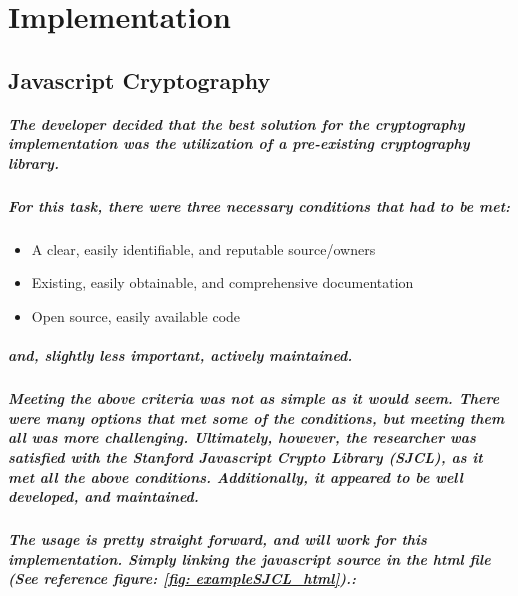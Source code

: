 \chapter{Implementation}



\section{Javascript Cryptography}

\paragraph{The developer decided that the best solution for the cryptography implementation was the utilization of a pre-existing cryptography library.}

\paragraph{For this task, there were three necessary conditions that had to be met:}

\begin{itemize}
\item A clear, easily identifiable, and reputable source/owners
\item Existing, easily obtainable, and comprehensive documentation
\item Open source, easily available code
\end{itemize}

\paragraph{and, slightly less important, actively maintained.}

\paragraph{Meeting the above criteria was not as simple as it would seem. There were many options that met some of the conditions, but meeting them all was more challenging. Ultimately, however, the researcher was satisfied with the Stanford Javascript Crypto Library (SJCL), as it met all the above conditions. Additionally, it appeared to be well developed, and maintained.}\cite[Website]{SJCL}

\paragraph{The usage is pretty straight forward, and will work for this implementation. Simply linking the javascript source in the html file (See reference figure: \ref{fig: exampleSJCL_html}).:}

